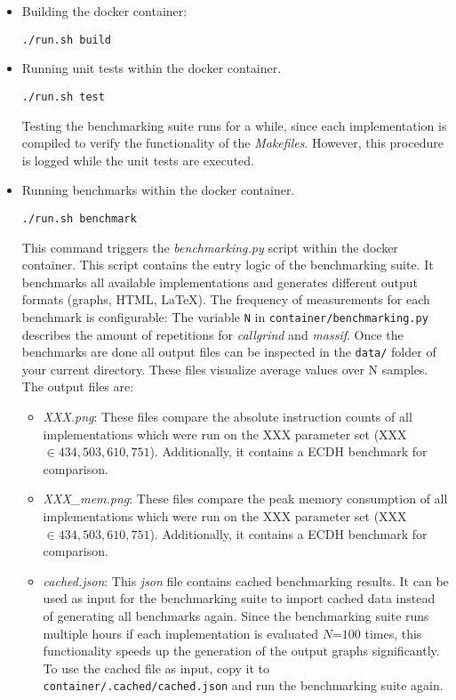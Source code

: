 \begin{itemize}
\itemsep0em 
\item Building the docker container:
\begin{lstlisting}[numbers=none,linewidth=4cm]
./run.sh build
\end{lstlisting}

\item Running unit tests within the docker container.
\begin{lstlisting}[numbers=none,linewidth=4cm]
./run.sh test
\end{lstlisting}
Testing the benchmarking suite runs for a while, since each implementation is compiled to verify the functionality of the \textit{Makefiles}. However, this procedure is logged while the unit tests are executed.

\item Running benchmarks within the docker container.
\begin{lstlisting}[numbers=none,linewidth=4cm]
./run.sh benchmark
\end{lstlisting}
This command triggers the \textit{benchmarking.py} script within the docker container. This script contains the entry logic of the benchmarking suite. It benchmarks all available implementations and generates different output formats (graphs, \gls{HTML}, LaTeX). The frequency of measurements for each benchmark is configurable: The variable \texttt{N} in \texttt{container/benchmarking.py} describes the amount of repetitions for \textit{callgrind} and \textit{massif}. Once the benchmarks are done all output files can be inspected in the  \texttt{data/} folder of your current directory. These files visualize average values over N samples. The output files are:
	\begin{itemize}
	\item \textit{XXX.png}: These files compare the absolute instruction counts of all implementations which were run on the XXX parameter set (XXX $\in {434, 503, 610, 751}$). Additionally, it contains a \gls{ECDH} benchmark for comparison.
	\item \textit{XXX\_mem.png}: These files compare the peak memory consumption of all implementations which were run on the XXX parameter set (XXX $\in {434, 503, 610, 751}$). Additionally, it contains a \gls{ECDH} benchmark for comparison.

	\item \textit{cached.json}: This \textit{json} file contains cached benchmarking results. It can be used as input for the benchmarking suite to import cached data instead of generating all benchmarks again. Since the benchmarking suite runs multiple hours if each implementation is evaluated $N$=$100$ times, this functionality speeds up the generation of the output graphs significantly. To use the cached file as input, copy it to \texttt{container/.cached/cached.json} and run the benchmarking suite again.
	

\end{itemize}
\end{itemize}
